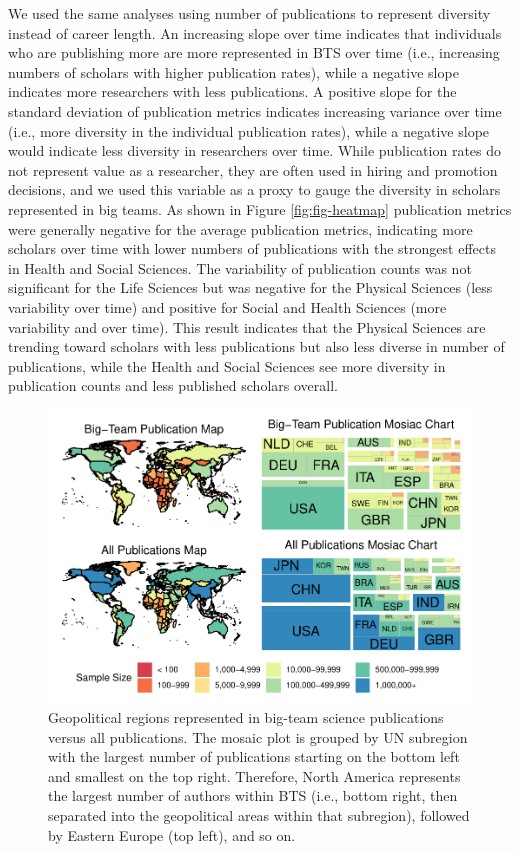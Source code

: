 \documentclass[
  man,mask,floatsintext]{apa7}
\begin{document}
We used the same analyses using number of publications to represent diversity instead of career length. An increasing slope over time indicates that
individuals who are publishing more are more represented in BTS over
time (i.e., increasing numbers of scholars with higher publication
rates), while a negative slope indicates more researchers with less
publications. A positive slope for the standard deviation of publication
metrics indicates increasing variance over time (i.e., more diversity in
the individual publication rates), while a negative slope would indicate
less diversity in researchers over time. While publication rates do not
represent value as a researcher, they are often used in hiring and
promotion decisions, and we used this variable as a proxy to gauge the
diversity in scholars represented in big teams. As shown in Figure
\ref{fig:fig-heatmap} publication metrics were generally negative for
the average publication metrics, indicating more scholars over time with
lower numbers of publications with the strongest effects in Health and
Social Sciences. The variability of publication counts was not
significant for the Life Sciences but was negative for the Physical
Sciences (less variability over time) and positive for Social and Health
Sciences (more variability and over time). This result indicates that
the Physical Sciences are trending toward scholars with less
publications but also less diverse in number of publications, while the
Health and Social Sciences see more diversity in publication counts and
less published scholars overall.

\begin{figure}
\centering
\includegraphics{manuscript_scopus_files/figure-latex/fig-map-both-1.pdf}
\caption{\label{fig:fig-map-both}Geopolitical regions represented in big-team science publications versus all publications. The mosaic plot is grouped by UN subregion with the largest number of publications starting on the bottom left and smallest on the top right. Therefore, North America represents the largest number of authors within BTS (i.e., bottom right, then separated into the geopolitical areas within that subregion), followed by Eastern Europe (top left), and so on.}
\end{figure}
\end{document}
